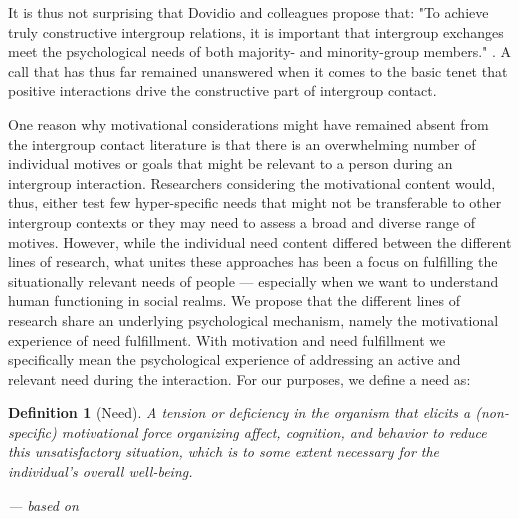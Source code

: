 \documentclass[man, 12pt, a4paper, mask]{apa7}
\theoremstyle{break}
\newtheorem{definition}{Definition}
\theoremstyle{plain}
\begin{document}
It is thus not surprising that Dovidio and colleagues propose that: "To achieve truly constructive intergroup relations, it is important that intergroup exchanges meet the psychological needs of both majority- and minority-group members." \citep[][p. 6]{Dovidio2017}. A call that has thus far remained unanswered when it comes to the basic tenet that positive interactions drive the constructive part of intergroup contact.

One reason why motivational considerations might have remained absent from the intergroup contact literature is that there is an overwhelming number of individual motives or goals that might be relevant to a person during an intergroup interaction. Researchers considering the motivational content would, thus, either test few hyper-specific needs that might not be transferable to other intergroup contexts or they may need to assess a broad and diverse range of motives. However, while the individual need content differed between the different lines of research, what unites these approaches has been a focus on fulfilling the situationally relevant needs of people --- especially when we want to understand human functioning in social realms. We propose that the different lines of research share an underlying psychological mechanism, namely the motivational experience of need fulfillment. With motivation and need fulfillment we specifically mean the psychological experience of addressing an active and relevant need during the interaction. For our purposes, we define a need as:

\begin{definition}[Need]\label{def:need}
A tension or deficiency in the organism that elicits a (non-specific) motivational force organizing affect, cognition, and behavior to reduce this unsatisfactory situation, which is to some extent necessary for the individual’s overall well-being.
\begin{flushright}
--- based on \citet[][]{dweck2017, Hull1943, Lewin1938, McClelland1987, Ryan2017, Steverink2006}
\end{flushright}
\end{definition}
\end{document}
